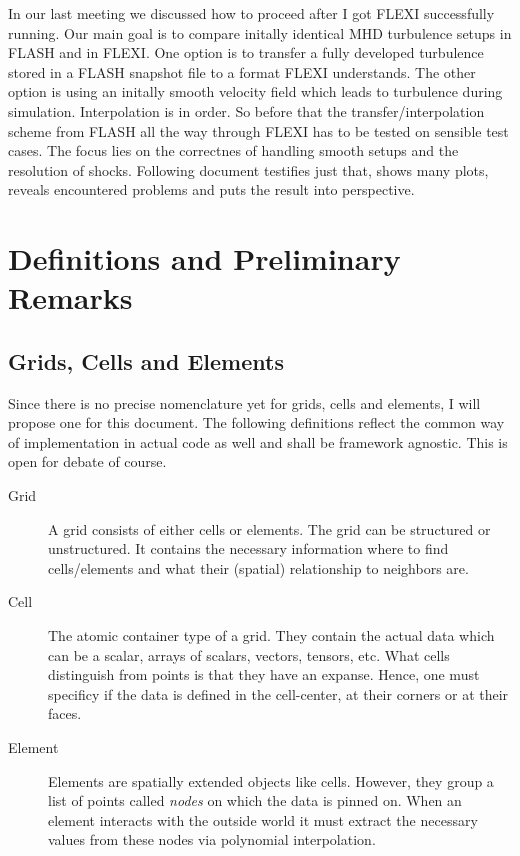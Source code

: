 In our last meeting we discussed how to proceed after I got FLEXI successfully
running. Our main goal is to compare initally identical MHD turbulence setups
in FLASH and in FLEXI. One option is to transfer a fully developed turbulence
stored in a FLASH snapshot file to a format FLEXI understands. The other option
is using an initally smooth velocity field which leads to turbulence during
simulation. Interpolation is in order. So before that the
transfer/interpolation scheme from FLASH all the way through FLEXI has to be
tested on sensible test cases. The focus lies on the correctnes of handling
smooth setups and the resolution of shocks. Following document testifies just
that, shows many plots, reveals encountered problems and puts the result into
perspective.

\section{Definitions and Preliminary Remarks}

\subsection{Grids, Cells and Elements}
Since there is no precise nomenclature yet for grids, cells and elements, I
will propose one for this document. The following definitions reflect the
common way of implementation in actual code as well and shall be framework
agnostic. This is open for debate of course.

\begin{description}
\item[Grid] A grid consists of either cells or elements. The grid can be
structured or unstructured. It contains the necessary information where to find
cells/elements and what their (spatial) relationship to neighbors are.

\item[Cell] The atomic container type of a grid. They contain the actual data
which can be a scalar, arrays of scalars, vectors, tensors, etc. What cells
distinguish from points is that they have an expanse. Hence, one must specificy
if the data is defined in the cell-center, at their corners or at their faces.

\item[Element] Elements are spatially extended objects like cells. However,
they group a list of points called \emph{nodes} on which the data is pinned on.
When an element interacts with the outside world it must extract the necessary
values from these nodes via polynomial interpolation.
\end{description}

